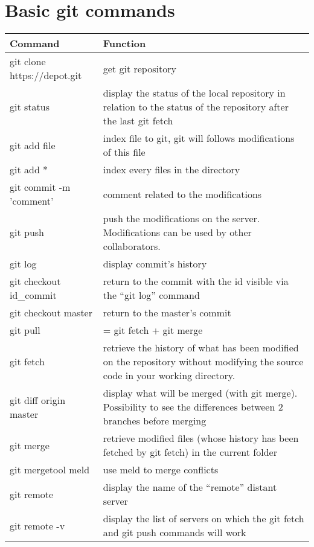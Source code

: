\section{Basic git commands}
\label{app:basic_git_commands}

\begin{table}[H]
\centering
\begin{tabular}{l|p{7cm}}
\hline
\textbf{Command} & \textbf{Function} \\
\hline
git clone https://depot.git & get git repository \\
\hline
git status & display the status of the local repository in relation to the status of the repository after the last git fetch \\
\hline
git add file & index file to git, git will follows modifications of this file \\
\hline
git add * & index every files in the directory \\
\hline
git commit -m 'comment' & comment related to the modifications \\
\hline
git push & push the modifications on the server. Modifications can be used by other collaborators. \\
\hline
git log & display commit's history \\
\hline
git checkout id\_commit & return to the commit with the id visible via the ``git log'' command \\
\hline
git checkout master & return to the master's commit \\
\hline
git pull & = git fetch + git merge \\
\hline
git fetch & retrieve the history of what has been modified on the repository without modifying the source code in your working directory. \\
\hline
git diff origin master & display what will be merged (with git merge). Possibility to see the differences between 2 branches before merging \\
\hline
git merge & retrieve modified files (whose history has been fetched by git fetch) in the current folder \\
\hline
git mergetool meld & use meld to merge conflicts \\
\hline
git remote & display the name of the ``remote'' distant server \\
\hline
git remote -v & display the list of servers on which the git fetch and git push commands will work \\

\end{tabular}
\end{table}
